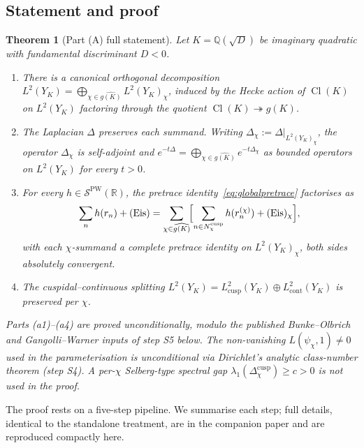 \documentclass[11pt,a4paper,reqno]{amsart}
\newtheorem{theorem}{Theorem}[section]
\theoremstyle{definition}
\DeclareMathOperator{\Cl}{Cl}
\newcommand{\RR}{\mathbb{R}}
\newcommand{\QQ}{\mathbb{Q}}
\newcommand{\YK}{Y_K}
\newcommand{\gK}{g(K)}
\newcommand{\dualgK}{\widehat{g(K)}}
\newcommand{\Lcusp}{L^2_{\mathrm{cusp}}}
\newcommand{\Lcont}{L^2_{\mathrm{cont}}}
\newcommand{\PW}{\mathcal{S}^{\mathrm{PW}}}
\begin{document}
\subsection{Statement and proof}\label{ss:Athm}

\begin{theorem}[Part (A) full statement]\label{thm:thmA}
Let $K=\QQ(\sqrt{D})$ be imaginary quadratic with fundamental discriminant
$D<0$.
\begin{enumerate}[label=\textup{(a\arabic*)},leftmargin=2em]
  \item There is a canonical orthogonal decomposition
        $L^2(\YK) = \bigoplus_{\chi\in\dualgK} L^2(\YK)_\chi$, induced by the
        Hecke action of $\Cl(K)$ on $L^2(\YK)$ factoring through the quotient
        $\Cl(K)\twoheadrightarrow\gK$.
  \item The Laplacian $\Delta$ preserves each summand.  Writing
        $\Delta_\chi := \Delta|_{L^2(\YK)_\chi}$, the operator $\Delta_\chi$
        is self-adjoint and
        $e^{-t\Delta} = \bigoplus_{\chi\in\dualgK} e^{-t\Delta_\chi}$
        as bounded operators on $L^2(\YK)$ for every $t>0$.
  \item For every $h\in\PW(\RR)$, the pretrace
        identity~\eqref{eq:globalpretrace} factorises as
        \[
          \sum_n h(r_n)+(\mathrm{Eis})
          = \sum_{\chi\in\dualgK}\!\Bigl[
              \sum_{n\in N_\chi^{\mathrm{cusp}}} h(r_n^{(\chi)})
              + (\mathrm{Eis})_\chi
            \Bigr],
        \]
        with each $\chi$-summand a complete pretrace identity on
        $L^2(\YK)_\chi$, both sides absolutely convergent.
  \item The cuspidal--continuous splitting
        $L^2(\YK)=\Lcusp(\YK)\oplus\Lcont(\YK)$ is preserved per $\chi$.
\end{enumerate}
Parts (a1)--(a4) are proved unconditionally, modulo the published
Bunke--Olbrich and Gangolli--Warner inputs of step S5 below.  The
non-vanishing $L(\psi_\chi,1)\neq 0$ used in the parameterisation is
unconditional via Dirichlet's analytic class-number theorem (step S4).
A per-$\chi$ Selberg-type spectral gap $\lambda_1(\Delta_\chi^{\mathrm{cusp}})
\geq c > 0$ is \emph{not} used in the proof.
\end{theorem}

The proof rests on a five-step pipeline.  We summarise each step; full
details, identical to the standalone treatment, are in the companion paper
\cite{Remondiere2026Survey} and are reproduced compactly here.
\end{document}
